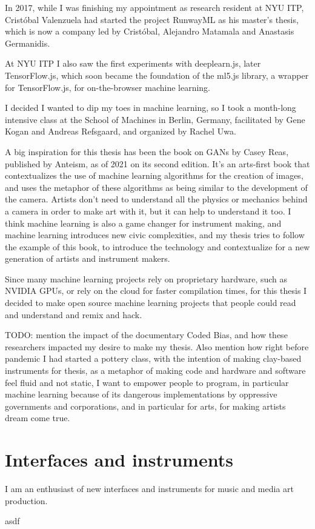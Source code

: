 In 2017, while I was finishing my appointment as research resident at NYU ITP, Cristóbal Valenzuela had started the project RunwayML as his master's thesis, which is now a company led by Cristóbal, Alejandro Matamala and Anastasis Germanidis.

At NYU ITP I also saw the first experiments with deeplearn.js, later TensorFlow.js, which soon became the foundation of the ml5.js library, a wrapper for TensorFlow.js, for on-the-browser machine learning.

I decided I wanted to dip my toes in machine learning, so I took a month-long intensive class at the School of Machines in Berlin, Germany, facilitated by Gene Kogan and Andreas Refsgaard, and organized by Rachel Uwa.

A big inspiration for this thesis has been the book on GANs by Casey Reas, published by Anteism, as of 2021 on its second edition. It’s an arts-first book that contextualizes the use of machine learning algorithms for the creation of images, and uses the metaphor of these algorithms as being similar to the development of the camera. Artists don’t need to understand all the physics or mechanics behind a camera in order to make art with it, but it can help to understand it too. I think machine learning is also a game changer for instrument making, and machine learning introduces new civic complexities, and my thesis tries to follow the example of this book, to introduce the technology and contextualize for a new generation of artists and instrument makers.

Since many machine learning projects rely on proprietary hardware, such as NVIDIA GPUs, or rely on the cloud for faster compilation times, for this thesis I decided to make open source machine learning projects that people could read and understand and remix and hack.

TODO: mention the impact of the documentary Coded Bias, and how these researchers impacted my desire to make my thesis. Also mention how right before pandemic I had started a pottery class, with the intention of making clay-based instruments for thesis, as a metaphor of making code and hardware and software feel fluid and not static, I want to empower people to program, in particular machine learning because of its dangerous implementations by oppressive governments and corporations, and in particular for arts, for making artists dream come true.

\section{Interfaces and instruments}

I am an enthusiast of new interfaces and instruments for music and media art production.

asdf

